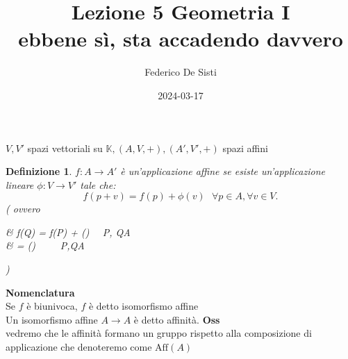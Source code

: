 \documentclass[12px]{article}
\title{Lezione 5 Geometria I \\
\large ebbene sì, sta accadendo davvero}
\date{2024-03-17}
\author{Federico De Sisti}
\theoremstyle{break}
\theoremstyle{break}
\theoremstyle{break}
\newtheorem{defin}{Definizione}
\theoremstyle{break}
\theoremstyle{break}
\theoremstyle{break}
\newenvironment{defi}
  {\begin{mdframed}\begin{defin}}
  {\end{defin}\end{mdframed}}
\begin{document}
\maketitle
\newpage
$V, V'$ spazi vettoriali su $\mathbb{K}, (A,V,+), (A',V',+)$ spazi affini\\
\begin{defi}
	$f:A\rightarrow A'$ è un'applicazione affine se esiste un'applicazione lineare $\phi :V\rightarrow V'$ tale che:  \[
	f(p + v) = f(p) + \phi (v) \ \ \ \forall p\in A, \forall v\in V
	.\]
	\left( ovvero \  \ \ 
		\begin{aligned}
		& f(Q) = f(P) + \phi() \ \ \forall P, Q\in A \\ 
		&  = \phi(\overrightarrow{PQ})\ \ \ \ \   \forall P,Q\in A \\ 
	\end{aligned}
\right)
\end{defi}
\textbf{Nomenclatura}\\
Se $f$ è biunivoca, $f$ è detto isomorfismo affine\\
Un isomorfismo affine $A\rightarrow A$ è detto affinità.
\textbf{Oss}\\
vedremo che le affinità formano un gruppo rispetto alla composizione di applicazione che denoteremo come $\text{Aff}(A)$\\
\end{document}
